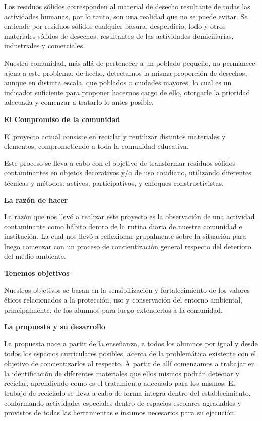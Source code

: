 \begin{fullwidth}
Los residuos sólidos corresponden al material de desecho resultante de
todas las actividades humanas, por lo tanto, son una realidad que no se
puede evitar. Se entiende por residuos sólidos cualquier basura,
desperdicio, lodo y otros materiales sólidos de desechos, resultantes de
las actividades domiciliarias, industriales y comerciales.

Nuestra comunidad, más allá de pertenecer a un poblado pequeño, no
permanece ajena a este problema; de hecho, detectamos la misma
proporción de desechos, aunque en distinta escala, que poblados o
ciudades mayores, lo cual es un indicador suﬁciente para proponer
hacernos cargo de ello, otorgarle la prioridad adecuada y comenzar a
tratarlo lo antes posible.

\textbf{El Compromiso de la comunidad }

El proyecto actual consiste en reciclar y reutilizar distintos
materiales y elementos, comprometiendo a toda la comunidad educativa.

Este proceso se lleva a cabo con el objetivo de transformar residuos
sólidos contaminantes en objetos decorativos y/o de uso cotidiano,
utilizando diferentes técnicas y métodos: activos, participativos, y
enfoques constructivistas.

\textbf{La razón de hacer }

La razón que nos llevó a realizar este proyecto es la observación de una
actividad contaminante como hábito dentro de la rutina diaria de nuestra
comunidad e institución. La cual nos llevó a reflexionar grupalmente
sobre la situación para luego comenzar con un proceso de concientización
general respecto del deterioro del medio ambiente.

\textbf{Tenemos objetivos}

Nuestros objetivos se basan en la sensibilización y fortalecimiento de
los valores éticos relacionados a la protección, uso y conservación del
entorno ambiental, principalmente, de los alumnos para luego extenderlos
a la comunidad.

\textbf{La propuesta y su desarrollo}

La propuesta nace a partir de la enseñanza, a todos los alumnos por
igual y desde todos los espacios curriculares posibles, acerca de la
problemática existente con el objetivo de concientizarlos al respecto. A
partir de allí comenzamos a trabajar en la identiﬁcación de diferentes
materiales que ellos mismos podrán detectar y reciclar, aprendiendo como
es el tratamiento adecuado para los mismos. El trabajo de reciclado se
lleva a cabo de forma íntegra dentro del establecimiento, conformando
actividades especiales dentro de espacios escolares agradables y
provistos de todas las herramientas e insumos necesarios para su
ejecución.


\end{fullwidth}
